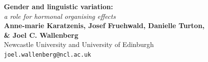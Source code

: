 \documentclass[a0,portrait]{a0poster}
\begin{document}


\begin{minipage}[b]{0.75\linewidth}
\veryHuge \color{NavyBlue} \textbf{Gender and linguistic variation:} \color{Black}\\ %
\Huge\textit{a role for hormonal organising effects}\\[2cm] %
\huge \textbf{Anne-marie Karatzenis, Josef Fruehwald, Danielle Turton, \vspace*{5mm}\\\& Joel C. Wallenberg}\\[0.5cm] %
\huge Newcastle University and University of Edinburgh \\[0.4cm] %
\Large \texttt{joel.wallenberg@ncl.ac.uk}\\
\end{minipage}
%
\end{document}
